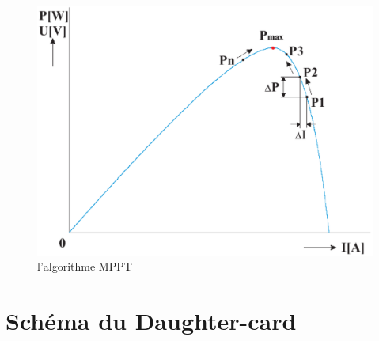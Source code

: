 \documentclass[11pt, a4paper, twoside]{book}
\begin{document}
\begin{figure}[h]
\label{fig:mppt}
\centering
\includegraphics[width=\textwidth]{mppt}
\caption{l'algorithme MPPT}
\end{figure}

\chapter{Schéma du Daughter-card}
%
%
\end{document}
